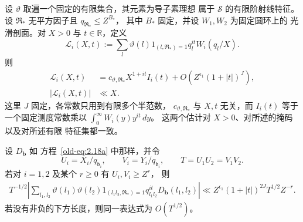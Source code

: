 \begin{lemma}[带掩码的矩形抵消]
\label{lem:centered-lattice-cancellation}
设 \(\vartheta\) 取遍一个固定的有限集合，其元素为导子素理想
属于 \(\mathcal S\) 的有限阶射线特征。设
\(\mathfrak R_*\) 无平方因子且 \(q_{\mathfrak R_*}\le Z^{B_*}\)，
其中 \(B_*\) 固定，并设 \(W_1,W_2\) 为固定圆环上的
光滑剖面。对 \(X>0\) 与 \(t\in\mathbb R\)，定义
\[
 \mathcal L_i(X,t):=
 \sum_l\vartheta(l)1_{(l,\mathfrak R_*)=1}
           q_l^{it}W_i(q_l/X).
\]
则
\begin{align}
 \mathcal L_i(X,t)
 &=c_{\vartheta,\mathfrak R_*}X^{1+it}I_i(t)
   +O\left(Z^{\epsilon_1}(1+|t|)^J\right),
 \label{old-eq:2.18d}\\
 |\mathcal L_i(X,t)|&\ll X.
 \label{old-eq:2.18e}
\end{align}
这里 \(J\) 固定，各常数只用到有限多个半范数，
\(c_{\vartheta,\mathfrak R_*}\) 与 \(X,t\) 无关，而
\(I_i(t)\) 等于一个固定测度常数乘以
\(\int_0^\infty W_i(y)y^{it}\,dy\)。
这两个估计对 \(X>0\)、对所述的掩码以及对所述有限
特征集都一致。

设 \(D_{\mathbf b}\) 如
方程~\eqref{old-eq:2.18a} 中那样，并令
\[
 U_i=X_i/q_{\mathfrak b_i},\qquad
 V_i=Y_i/q_{\mathfrak b_i},\qquad
 T=U_1U_2=V_1V_2.
\]
若对 \(i=1,2\) 及某个 \(r\ge0\) 有 \(U_i,V_i\ge Z^r\)，
则
\begin{equation}
 \begin{split}
 T^{-1/2}\left|
 \sum_{l_1,l_2}
 \vartheta(l_1)\vartheta(l_2)
 1_{(l_1l_2,\mathfrak R_*)=1}
 q_{l_1l_2}^{it}D_{\mathbf b}(l_1,l_2)
 \right|
 \ll Z^{\epsilon_1}(1+|t|)^{2J}T^{1/2}Z^{-r}.
 \end{split}
 \label{old-eq:2.18f}
\end{equation}
若没有非负的下方长度，则同一表达式为
\(O(T^{1/2})\)。
\end{lemma}

